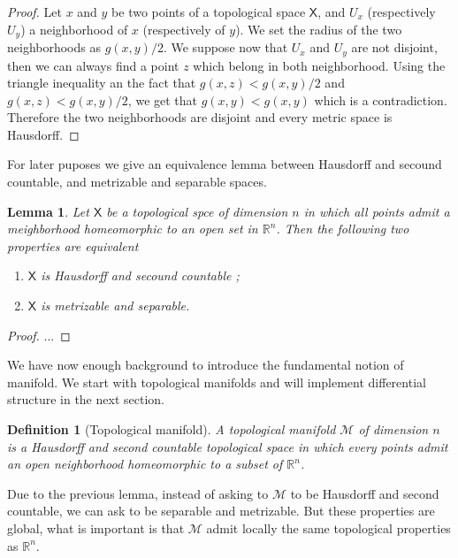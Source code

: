 \documentclass[11pt]{book}
\newcommand{\Mcal}{\mathcal{M}}
\newcommand{\Rbb}{\mathbb{R}}
\newcommand{\Xsf}{\mathsf{X}}
\theoremstyle{break}
\newtheorem{lemma}{Lemma}
\newtheorem{definition}{Definition}
\newtheorem{proof}{Proof}
\begin{document}
\begin{proof}
Let $x$ and $y$ be two points of a topological space $\Xsf$, and $U_x$ (respectively $U_y$) a neighborhood of $x$ (respectively of $y$). We set the radius of the two neighborhoods as $g(x,y)/2$. We suppose now that $U_x$ and $U_y$ are not disjoint, then we can always find a point $z$ which belong in both neighborhood. Using the triangle inequality an the fact that $g(x,z) < g(x,y)/2$ and $g(x,z) < g(x,y)/2$, we get that $g(x,y) < g(x,y)$ which is a contradiction. Therefore the two neighborhoods are disjoint and every metric space is Hausdorff.
\end{proof}


For later puposes we give an equivalence lemma between Hausdorff and secound countable, and metrizable and separable spaces.

\begin{lemma}
Let $\Xsf$ be a topological spce of dimension $n$ in which all points admit a meighborhood homeomorphic to an open set in $\Rbb^n$. Then the following two properties are equivalent
%
\begin{enumerate}
\vspace*{-4pt}
\setlength{\itemsep}{-1pt}
\item $\Xsf$ is Hausdorff and secound countable ;
\item $\Xsf$ is metrizable and separable.
\end{enumerate}
%
\end{lemma}


\begin{proof}
...
\end{proof}


We have now enough background to introduce the fundamental notion of manifold. We start with topological manifolds and will implement differential structure in the next section.


\begin{definition}[Topological manifold]
A topological manifold $\Mcal$ of dimension $n$ is a Hausdorff and second countable topological space in which every points admit an open neighborhood homeomorphic to a subset of $\Rbb^n$.
\end{definition}

Due to the previous lemma, instead of asking to $\Mcal$ to be Hausdorff and second countable, we can ask to be separable and metrizable. But these properties are global, what is important is that $\Mcal$ admit locally the same topological properties as $\Rbb^n$.\par%
\end{document}
